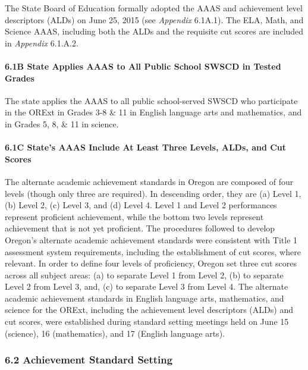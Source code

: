 \documentclass[]{article}
\let\oldparagraph\paragraph
\renewcommand{\paragraph}[1]{\oldparagraph{#1}\mbox{}}
\begin{document}
The State Board of Education formally adopted the AAAS and achievement
level descriptors (ALDs) on June 25, 2015 (see \emph{Appendix} 6.1A.1).
The ELA, Math, and Science AAAS, including both the ALDs and the
requisite cut scores are included in \emph{Appendix} 6.1.A.2.

\hypertarget{b-state-applies-aaas-to-all-public-school-swscd-in-tested-grades}{%
\paragraph{6.1B State Applies AAAS to All Public School SWSCD in Tested
Grades}\label{b-state-applies-aaas-to-all-public-school-swscd-in-tested-grades}}

The state applies the AAAS to all public school-served SWSCD who
participate in the ORExt in Grades 3-8 \& 11 in English language arts
and mathematics, and in Grades 5, 8, \& 11 in science.

\hypertarget{c-states-aaas-include-at-least-three-levels-alds-and-cut-scores}{%
\paragraph{6.1C State's AAAS Include At Least Three Levels, ALDs, and
Cut
Scores}\label{c-states-aaas-include-at-least-three-levels-alds-and-cut-scores}}

The alternate academic achievement standards in Oregon are composed of
four levels (though only three are required). In descending order, they
are (a) Level 1, (b) Level 2, (c) Level 3, and (d) Level 4. Level 1 and
Level 2 performances represent proficient achievement, while the bottom
two levels represent achievement that is not yet proficient. The
procedures followed to develop Oregon's alternate academic achievement
standards were consistent with Title 1 assessment system requirements,
including the establishment of cut scores, where relevant. In order to
define four levels of proficiency, Oregon set three cut scores across
all subject areas: (a) to separate Level 1 from Level 2, (b) to separate
Level 2 from Level 3, and, (c) to separate Level 3 from Level 4. The
alternate academic achievement standards in English language arts,
mathematics, and science for the ORExt, including the achievement level
descriptors (ALDs) and cut scores, were established during standard
setting meetings held on June 15 (science), 16 (mathematics), and 17
(English language arts).

\hypertarget{achievement-standard-setting}{%
\subsubsection{6.2 Achievement Standard
Setting}\label{achievement-standard-setting}}
\end{document}
